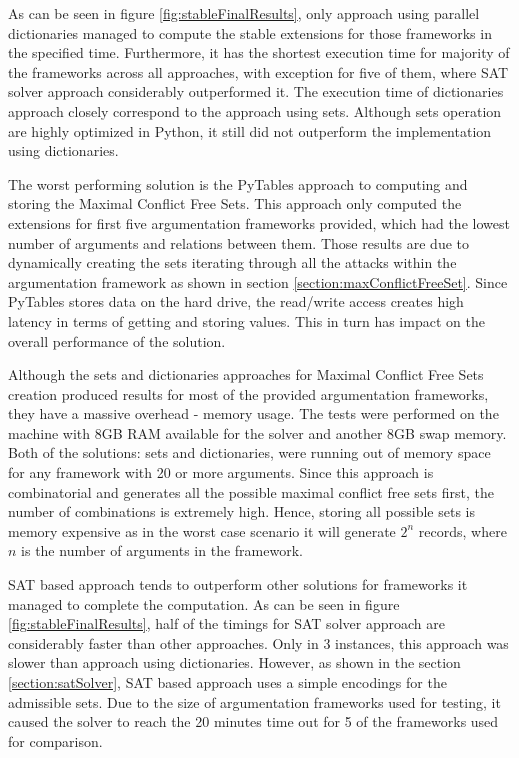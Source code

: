 As can be seen in figure \ref{fig:stableFinalResults}, only approach using parallel dictionaries managed to compute the stable extensions for those frameworks in the specified time. Furthermore, it has the shortest execution time for majority of the frameworks across all approaches, with exception for five of them, where SAT solver approach considerably outperformed it. The execution time of dictionaries approach closely correspond to the approach using sets. Although sets operation are highly optimized in Python, it still did not outperform the implementation using dictionaries.

The worst performing solution is the PyTables approach to computing and storing the Maximal Conflict Free Sets. This approach only computed the extensions for first five argumentation frameworks provided, which had the lowest number of arguments and relations between them. Those results are due to dynamically creating the sets iterating through all the attacks within the argumentation framework as shown in section \ref{section:maxConflictFreeSet}. Since PyTables stores data on the hard drive, the read/write access creates high latency in terms of getting and storing values. This in turn has impact on the overall performance of the solution. 

Although the sets and dictionaries approaches for Maximal Conflict Free Sets creation produced results for most of the provided argumentation frameworks, they have a massive overhead - memory usage. The tests were performed on the machine with 8GB RAM available for the solver and another 8GB swap memory. Both of the solutions: sets and dictionaries, were running out of memory space for any framework with 20 or more arguments. Since this approach is combinatorial and generates all the possible maximal conflict free sets first, the number of combinations is extremely high. Hence, storing all possible sets is memory expensive as in the worst case scenario it will generate $2^n$ records, where $n$ is the number of arguments in the framework.

SAT based approach tends to outperform other solutions for frameworks it managed to complete the computation. As can be seen in figure \ref{fig:stableFinalResults}, half of the timings for SAT solver approach are considerably faster than other approaches. Only in 3 instances, this approach was slower than approach using dictionaries. However, as shown in the section \ref{section:satSolver}, SAT based approach uses a simple encodings for the admissible sets. Due to the size of argumentation frameworks used for testing, it caused the solver to reach the 20 minutes time out for 5 of the frameworks used for comparison. 

